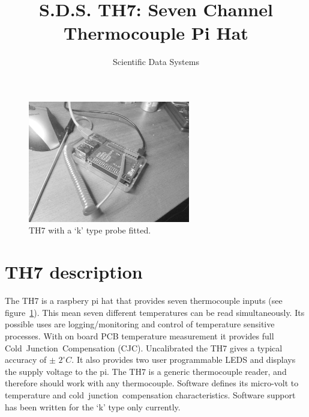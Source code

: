 \documentclass[10pt,foldmark]{leaflet}
\title{S.D.S. TH7: Seven Channel Thermocouple  Pi Hat}
\author{Scientific Data Systems}
\begin{document}
\maketitle

\begin{figure}
 \centering
 \includegraphics[width=200pt]{./TH7_0p4_IMG_20181010_184556D.jpg}
 \caption{TH7 with a `k' type probe fitted.}
 \label{fig:th7}
\end{figure}



\section{TH7 description}
The TH7 is a raspbery pi hat   that
provides seven thermocouple inputs (see figure~\ref{fig:th7}). This mean seven different temperatures can be read
simultaneously. Its possible uses are 
logging/monitoring and control of temperature sensitive processes.
%
With on board PCB temperature measurement
it provides full Cold~Junction~Compensation (CJC).
Uncalibrated the TH7 gives a typical accuracy of $\pm$ ${2}^{\circ} C$.
It also provides two user programmable LEDS and displays the supply voltage to the pi.
\clearpage
The TH7 is a generic thermocouple reader, and therefore should work with any thermocouple.
Software defines its micro-volt to temperature and cold~junction~compensation characteristics.
Software support has been written for the `k' type only currently.

\end{document}
